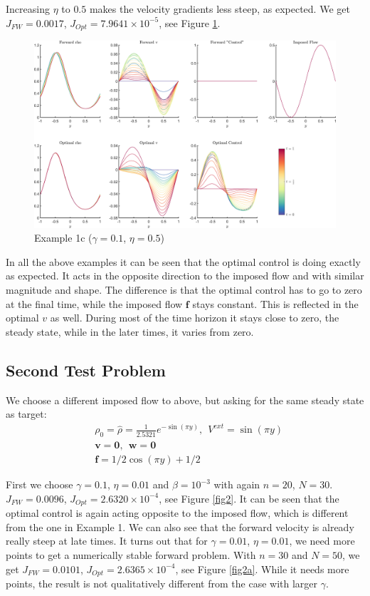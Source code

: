 \documentclass[11pt, a4paper]{article}
\theoremstyle{definition}
\newcommand{\Sta}{\rho}
\newcommand{\Stav}{\mathbf{v}}
\newcommand{\Con}{\mathbf{f}}
\begin{document}
    Increasing $\eta$ to $0.5$ makes the velocity gradients less steep, as expected. We get $J_{FW} = 0.0017$, $J_{Opt} = 7.9641 \times 10^{-5}$, see Figure \ref{fig1c}. 
    \begin{figure}
    	\includegraphics[scale=0.05]{Example1c.png}
    	\caption{Example 1c ($\gamma = 0.1$, $\eta = 0.5$)}
    	\label{fig1c}
    \end{figure} 	   


In all the above examples it can be seen that the optimal control is doing exactly as expected. It acts in the opposite direction to the imposed flow and with similar magnitude and shape. The difference is that the optimal control has to go to zero at the final time, while the imposed flow $\Con$ stays constant. This is reflected in the optimal $v$ as well. During most of the time horizon it stays close to zero, the steady state, while in the later times, it varies from zero.

\subsection{Second Test Problem}
We choose a different imposed flow to above, but asking for the same steady state as target:
   \begin{align*}
&\Sta_0 = \hat \Sta =  \frac{1}{2.5321}e^{-\sin(\pi y)}, \ \ V^{ext} = \sin(\pi y)\\
&\Stav = \mathbf{0}, \ \  \mathbf{w} = \mathbf{0}\\
&\Con = 1/2\cos(\pi y) + 1/2
\end{align*}
	
First we choose $\gamma = 0.1$, $\eta = 0.01$ and $\beta = 10^{-3}$ with again $n = 20$, $N=30$. $J_{FW} = 0.0096$, $J_{Opt} = 2.6320 \times 10^{-4}$, see Figure \ref{fig2}. It can be seen that the optimal control is again acting opposite to the imposed flow, which is different from the one in Example 1. We can also see that the forward velocity is already really steep at late times. It turns out that for $\gamma = 0.01$, $\eta = 0.01$, we need more points to get a numerically stable forward problem. With $n = 30$ and $N = 50$, we get $J_{FW} = 0.0101$, $J_{Opt} = 2.6365 \times 10^{-4}$, see Figure \ref{fig2a}. While it needs more points, the result is not qualitatively different from the case with larger $\gamma$.
\end{document}
